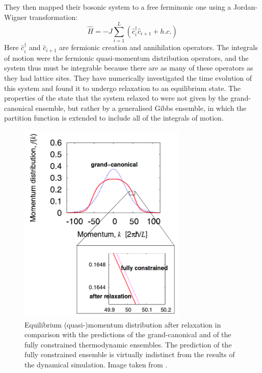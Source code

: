 \documentclass[a4paper, 10pt]{article}
\theoremstyle{plain}
\begin{document}
They then mapped their bosonic system to a free ferminonic one using a
Jordan-Wigner transformation:
\begin{equation}
 \hat{H}=-J\sum_{i=1}^{L} (\hat{c}_{i}^{\dagger}\hat{c}_{i+1}+h.c.)
\end{equation}
Here $\hat{c}_{i}^{\dagger}$ and $\hat{c}_{i+1}$ are fermionic creation and
annihilation operators. The integrals of motion were the fermionic
quasi-momentum distribution operators, and the system thus must be
integrable because there are as many of these operators as they had lattice
sites. They have numerically investigated the time evolution of this system and
found it to undergo relaxation to an equilibrium state. The properties of the
state that the system relaxed to were not given by the grand-canonical
ensemble, but rather by a generalised Gibbs ensemble, in which the partition
function is extended to include all of the integrals of motion.


\begin{figure}[H]
    \begin{center}
        \includegraphics[width=8cm]{grand_canonical_vs_GGE}
    \end{center}
    \caption{Equilibrium (quasi-)momentum distribution after relaxation in
             comparison with the predictions of the grand-canonical and of the
             fully constrained thermodynamic ensembles. The prediction  of the
             fully constrained  ensemble  is virtually  indistinct from the
             results of the dynamical simulation. Image taken from
             \cite{Rigol2007}.}
 \end{figure}
\end{document}
